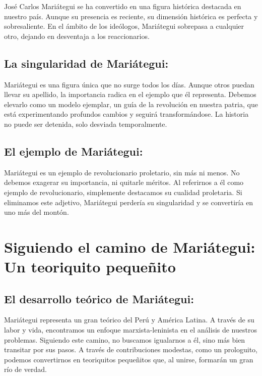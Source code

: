 \documentclass[
  a4paper,
]{article}
\begin{document}
José Carlos Mariátegui se ha convertido en una figura histórica
destacada en nuestro país. Aunque su presencia es reciente, su dimensión
histórica es perfecta y sobresaliente. En el ámbito de los ideólogos,
Mariátegui sobrepasa a cualquier otro, dejando en desventaja a los
reaccionarios.

\hypertarget{la-singularidad-de-mariuxe1tegui}{%
\subsection{La singularidad de
Mariátegui:}\label{la-singularidad-de-mariuxe1tegui}}

Mariátegui es una figura única que no surge todos los días. Aunque otros
puedan llevar su apellido, la importancia radica en el ejemplo que él
representa. Debemos elevarlo como un modelo ejemplar, un guía de la
revolución en nuestra patria, que está experimentando profundos cambios
y seguirá transformándose. La historia no puede ser detenida, solo
desviada temporalmente.

\hypertarget{el-ejemplo-de-mariuxe1tegui}{%
\subsection{El ejemplo de
Mariátegui:}\label{el-ejemplo-de-mariuxe1tegui}}

Mariátegui es un ejemplo de revolucionario proletario, sin más ni menos.
No debemos exagerar su importancia, ni quitarle méritos. Al referirnos a
él como ejemplo de revolucionario, simplemente destacamos su cualidad
proletaria. Si eliminamos este adjetivo, Mariátegui perdería su
singularidad y se convertiría en uno más del montón.

\hypertarget{siguiendo-el-camino-de-mariuxe1tegui-un-teoriquito-pequeuxf1ito}{%
\section{Siguiendo el camino de Mariátegui: Un teoriquito
pequeñito}\label{siguiendo-el-camino-de-mariuxe1tegui-un-teoriquito-pequeuxf1ito}}

\hypertarget{el-desarrollo-teuxf3rico-de-mariuxe1tegui}{%
\subsection{El desarrollo teórico de
Mariátegui:}\label{el-desarrollo-teuxf3rico-de-mariuxe1tegui}}

Mariátegui representa un gran teórico del Perú y América Latina. A
través de su labor y vida, encontramos un enfoque marxista-leninista en
el análisis de nuestros problemas. Siguiendo este camino, no buscamos
igualarnos a él, sino más bien transitar por sus pasos. A través de
contribuciones modestas, como un prologuito, podemos convertirnos en
teoriquitos pequeñitos que, al unirse, formarán un gran río de verdad.
\end{document}
